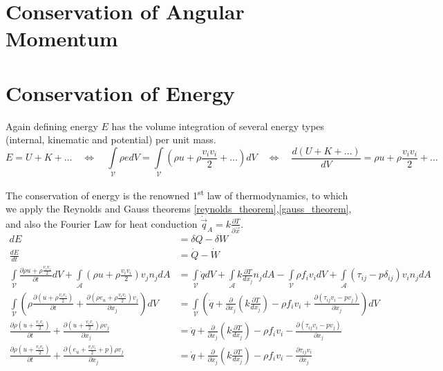 \section{Conservation of Angular Momentum}

\section{Conservation of Energy}
Again defining energy $E$ has the volume integration of several energy types (internal, kinematic and potential) per unit mass.
\begin{equation}
E= U + K + \ldots \quad \Leftrightarrow \quad \int\limits_{\mathcal{V}} \rho e dV =  \int\limits_{\mathcal{V}} (\rho u+ \rho\frac{v_i v_i}{2} + \ldots) dV \quad  \Leftrightarrow \quad  \frac{d(U + K + \ldots) }{dV} = \rho u+ \rho\frac{v_i v_i}{2} + \ldots
\end{equation}

The conservation of energy is the renowned 1\textsuperscript{st} law of thermodynamics, to which we apply the Reynolds and Gauss theorems \eqref{reynolds_theorem},\eqref{gauss_theorem}, and also the Fourier Law for heat conduction $\dot{\vec{q}}_A = k\frac{\partial T}{\partial \vec{x}}$.
\begin{align}
    \label{differential_energy}
    dE &= \delta Q- \delta W \\
    \frac{dE}{dt} &= \dot{Q} - \dot{W} \\
    \int\limits_{\mathcal{V}} \frac{\partial \rho u+ \rho\frac{v_iv_i}{2}}{\partial t} dV +  \int\limits_{\mathcal{A}} (\rho u + \rho\frac{v_i v_i}{2}) v_j n_j dA
    &=  \int\limits_{\mathcal{V}} \dot{q} dV + \int\limits_{\mathcal{A}} k\frac{\partial T}{d x_j} n_j dA - \int\limits_{\mathcal{V}} \rho f_i v_i dV + \int\limits_{\mathcal{A}} \left(\tau_{ij}- p \delta_{ij} \right)v_i n_j dA \\
    \int\limits_{\mathcal{V}}\left( \rho \frac{\partial \left( u+ \rho\frac{v_iv_i}{2}\right)}{\partial t} + \frac{\partial \left(\rho e_u+ \rho\frac{v_i v_i}{2}\right) v_j}{\partial x_j} \right) dV
    &=  \int\limits_{\mathcal{V}}\left( \dot{q} + \frac{\partial}{\partial x_j} \left( k\frac{\partial T}{d x_j} \right) - \rho f_i v_i + \frac{\partial \left(\tau_{ij}v_i- p v_j \right )}{\partial x_j} \right) dV  \\
    \frac{\partial \rho \left( u+ \frac{v_i v_i}{2} \right)}{\partial t} +  \frac{\partial \left( u + \frac{v_i v_i}{2}\right) \rho v_j}{\partial x_j}
    &=  \dot{q} + \frac{\partial} {\partial x_j} \left( k\frac{\partial T}{d x_j} \right) - \rho f_i v_i - \frac{\partial \left(\tau_{ij}v_i- p v_j \right)}{\partial x_j} \\
	\frac{\partial \rho \left( u+ \frac{v_i v_i}{2} \right)}{\partial t} +  \frac{\partial \left( e_u + \frac{v_i v_i}{2} + p  \right)\rho v_j}{\partial x_j}
    &=  \dot{q} + \frac{\partial} {\partial x_j} \left( k\frac{\partial T}{d x_j} \right) - \rho f_i v_i - \frac{\partial \tau_{ij}v_i}{\partial x_j}
\end{align}





